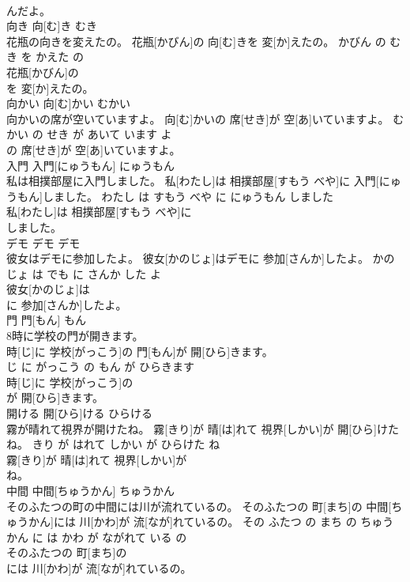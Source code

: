 \documentclass[8pt]{extreport}
\begin{document}
\begin{CJK}{UTF8}{min}
\\	んだよ。			
\\	向き	向[む]き	むき	
\\	花瓶の向きを変えたの。	花瓶[かびん]の 向[む]きを 変[か]えたの。	かびん の むき を かえた の	
\\	花瓶[かびん]の
\\	を 変[か]えたの。			
\\	向かい	向[む]かい	むかい	
\\	向かいの席が空いていますよ。	向[む]かいの 席[せき]が 空[あ]いていますよ。	むかい の せき が あいて います よ	
\\	の 席[せき]が 空[あ]いていますよ。			
\\	入門	入門[にゅうもん]	にゅうもん	
\\	私は相撲部屋に入門しました。	私[わたし]は 相撲部屋[すもう べや]に 入門[にゅうもん]しました。	わたし は すもう べや に にゅうもん しました	
\\	私[わたし]は 相撲部屋[すもう べや]に
\\	しました。			
\\	デモ	デモ	デモ	
\\	彼女はデモに参加したよ。	彼女[かのじょ]はデモに 参加[さんか]したよ。	かのじょ は でも に さんか した よ	
\\	彼女[かのじょ]は
\\	に 参加[さんか]したよ。			
\\	門	門[もん]	もん	
\\	8時に学校の門が開きます。	
\\	時[じ]に 学校[がっこう]の 門[もん]が 開[ひら]きます。	
\\	じ に がっこう の もん が ひらきます	
\\	時[じ]に 学校[がっこう]の
\\	が 開[ひら]きます。			
\\	開ける	開[ひら]ける	ひらける	
\\	霧が晴れて視界が開けたね。	霧[きり]が 晴[は]れて 視界[しかい]が 開[ひら]けたね。	きり が はれて しかい が ひらけた ね	
\\	霧[きり]が 晴[は]れて 視界[しかい]が
\\	ね。			
\\	中間	中間[ちゅうかん]	ちゅうかん	
\\	そのふたつの町の中間には川が流れているの。	そのふたつの 町[まち]の 中間[ちゅうかん]には 川[かわ]が 流[なが]れているの。	その ふたつ の まち の ちゅうかん に は かわ が ながれて いる の	
\\	そのふたつの 町[まち]の
\\	には 川[かわ]が 流[なが]れているの。			

\end{CJK}
\end{document}
